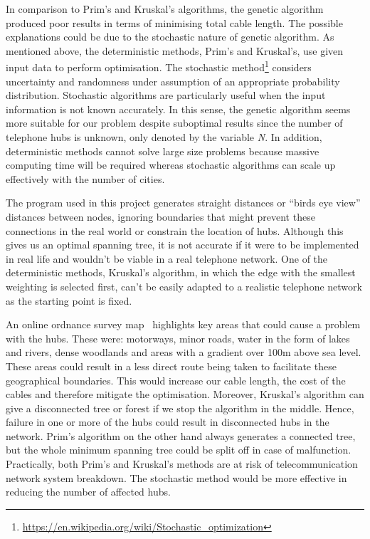 \documentclass[twocolumn]{article}
\begin{document}
In comparison to Prim’s and Kruskal’s algorithms, the genetic algorithm produced poor results in terms of minimising total cable length. The possible explanations could be due to the stochastic nature of genetic algorithm.
As mentioned above, the deterministic methods, Prim’s and Kruskal’s, use given input data to perform optimisation. The stochastic method\footnote{\url{https://en.wikipedia.org/wiki/Stochastic_optimization}} considers uncertainty and randomness under assumption of an appropriate probability distribution. Stochastic algorithms are particularly useful when the input information is not known accurately. In this sense, the genetic algorithm seems more suitable for our problem despite suboptimal results since the number of telephone hubs is unknown, only denoted by the variable \textit{N}.
In addition, deterministic methods cannot solve large size problems because massive computing time will be required whereas stochastic algorithms can scale up effectively with the number of cities.
 

The program used in this project generates straight distances or “birds eye view” distances between nodes, ignoring boundaries that might prevent these connections in the real world or constrain the location of hubs. Although this gives us an optimal spanning tree, it is not accurate if it were to be implemented in real life and wouldn’t be viable in a real telephone network. One of the deterministic methods, Kruskal’s algorithm, in which the edge with the smallest weighting is selected first, can’t be easily adapted to a realistic telephone network as the starting point is fixed.

An online ordnance survey map~\cite{OS} highlights key areas that could cause a problem with the hubs. These were: motorways, minor roads, water in the form of lakes and rivers, dense woodlands and areas with a gradient over 100m above sea level. These areas could result in a less direct route being taken to facilitate these geographical boundaries. This would increase our cable length, the cost of the cables and therefore mitigate the optimisation.
Moreover, Kruskal’s algorithm can give a disconnected tree or forest if we stop the algorithm in the middle. Hence, failure in one or more of the hubs could result in disconnected hubs in the network. Prim's algorithm on the other hand always generates a connected tree, but the whole minimum spanning tree could be split off in case of malfunction. Practically, both Prim’s and Kruskal’s methods are at risk of telecommunication network system breakdown. The stochastic method would be more effective in reducing the number of affected hubs.
\end{document}
